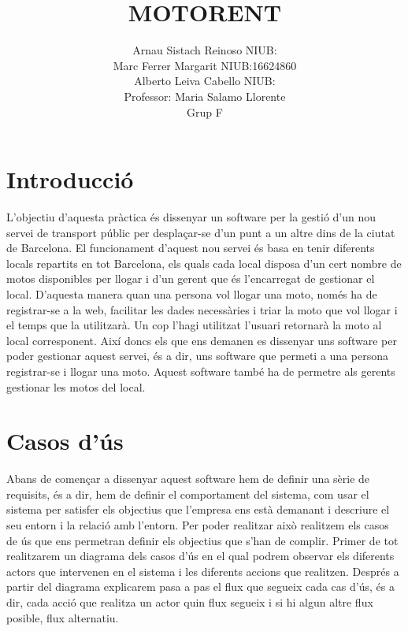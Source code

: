 \documentclass{article}
\title{\textbf{MOTORENT}}
\author{Arnau Sistach Reinoso NIUB:\\Marc Ferrer Margarit NIUB:16624860\\ Alberto Leiva Cabello NIUB: \\Professor: Maria Salamo Llorente \\ Grup F}
\begin{document}
\maketitle
\newpage
\tableofcontents
\newpage
\section{Introducci\'o}

L'objectiu d'aquesta pr\`actica és dissenyar un software per la gestió d'un nou servei de transport p\'ublic per despla\c car-se d'un punt a un altre dins de la ciutat de Barcelona. 
\newline
El funcionament d'aquest nou servei \'es basa en tenir diferents locals repartits en tot Barcelona, els quals cada local disposa d'un cert nombre de motos disponibles per llogar i d'un gerent que \'es l'encarregat de gestionar el local. D'aquesta manera quan una persona vol llogar una moto, nom\'es ha de registrar-se a la web, facilitar les dades necess\`aries i triar la moto que vol llogar i el temps que la utilitzar\`a. Un cop l'hagi utilitzat l'usuari retornar\`a la moto al local corresponent. 
\newline
Aix\'i doncs els que ens demanen es dissenyar uns software per poder gestionar aquest servei, \'es a dir, uns software que permeti a una persona registrar-se i llogar una moto. Aquest software tamb\'e ha de permetre als gerents gestionar les motos del local.
\section{Casos d'\'us}
Abans de començar a dissenyar aquest software hem de definir una s\`erie de requisits, \'es a dir, hem de definir el comportament del sistema, com usar el sistema per satisfer els objectius que l'empresa ens est\`a demanant i descriure el seu entorn i la relaci\'o amb l'entorn. Per poder realitzar aix\`o realitzem els casos de \'us que ens permetran definir els objectius que s'han de complir. 
\newline
Primer de tot realitzarem un diagrama dels casos d'\'us en el qual podrem observar els diferents actors que intervenen en el sistema i les diferents accions que realitzen. Despr\'es a partir del diagrama explicarem pasa a pas el flux que segueix cada cas d'\'us, \'es a dir, cada acci\'o que realitza un actor quin flux segueix i si hi algun altre flux posible, flux alternatiu.
\end{document}
